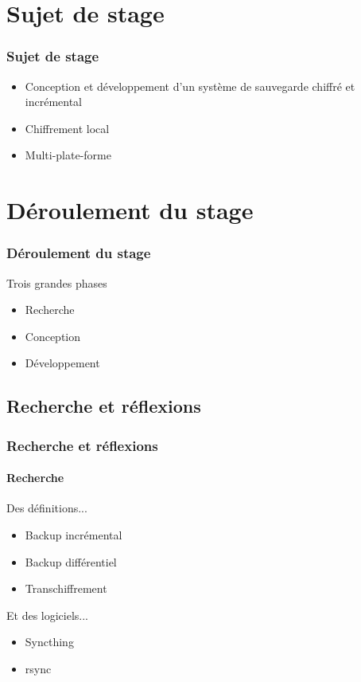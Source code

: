 \documentclass{beamer}
\begin{document}
\section{Sujet de stage}
\begin{frame}
 \frametitle{Sujet de stage}
 \begin{itemize}
  \item Conception et d\'eveloppement d'un syst\`eme de sauvegarde 
  chiffr\'e et incr\'emental
  \item Chiffrement local
  \item Multi-plate-forme
 \end{itemize}
\end{frame}

\section{D\'eroulement du stage}
\begin{frame}
 \frametitle{D\'eroulement du stage}
 Trois grandes phases
 \begin{itemize}
  \item Recherche
  \item Conception
  \item D\'eveloppement
 \end{itemize}
\end{frame}

\subsection{Recherche et r\'eflexions}
\begin{frame}
 \frametitle{Recherche et r\'eflexions}
 \framesubtitle{Recherche}
 Des d\'efinitions...
 \begin{itemize}
  \item Backup incr\'emental
  \item Backup diff\'erentiel
  \item Transchiffrement\\[0.51cm]
 \end{itemize}
 
 Et des logiciels...
 \begin{itemize}
  \item Syncthing
  \item rsync
 \end{itemize}
\end{frame}
\end{document}
